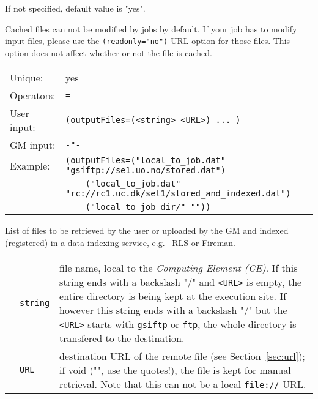   If not specified, default value is "yes".

  \begin{framed} 
  Cached files can not be modified by jobs by default. If your job has
  to modify input files, please use the \texttt{(readonly="no")} URL
  option for those files. This option does not affect whether or not
  the file is cached.
  \end{framed}

  \hspace*{0.5cm}
  \begin{shaded}
  \end{shaded}
  \begin{tabular}{lp{13cm}}
    Unique:&yes\\
    Operators:&\verb#=#\\
    User input:&\verb#(outputFiles=(<string> <URL>) ... )#\\
    GM input:&\verb#-"-#\\
    Example:&\verb#(outputFiles=("local_to_job.dat" "gsiftp://se1.uo.no/stored.dat")#\\
    &\verb#    ("local_to_job.dat" "rc://rc1.uc.dk/set1/stored_and_indexed.dat")#\\  
    &\verb#    ("local_to_job_dir/" ""))#\\  
  \end{tabular}

  List of files to be retrieved by the user or uploaded by the GM and
  indexed (registered) in a data indexing service, e.g. \globus\  RLS or Fireman.

  \begin{tabular}{llp{10cm}}
    \hspace*{1cm}&\texttt{string}& file name, local to the
    \textit{Computing Element (CE)}\index{Computing Element}. If this
    string ends with a backslash "/" and \verb#<URL># is empty, the
    entire directory is being kept at the execution site. If however
    this string ends with a backslash "/" but the \verb#<URL>#
    starts with \texttt{gsiftp} or \texttt{ftp}, the whole directory
    is transfered to the destination.\\
    \hspace*{1cm}&\texttt{URL} & destination URL of the remote file (see
    Section~\ref{sec:url}); if void ("", use the quotes!), the file is
    kept for manual retrieval.  Note that this can not be a local
    \texttt{file://} URL.\\
  \end{tabular}

